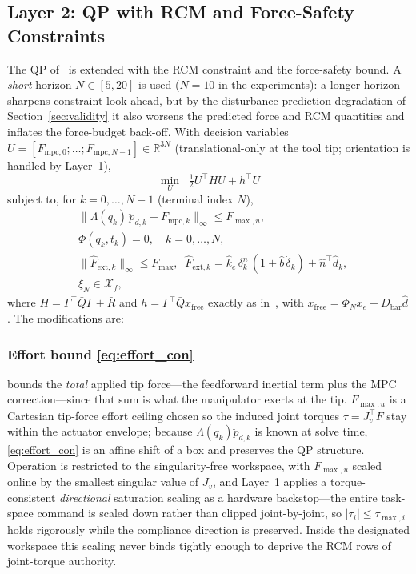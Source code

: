 \subsection{Layer 2: QP with RCM and Force-Safety Constraints}\label{sec:qp}

The QP of~\cite{cao2026phri} is extended with the RCM constraint and the force-safety bound. A \emph{short} horizon $N\in[5,20]$ is used ($N=10$ in the experiments): a longer horizon sharpens constraint look-ahead, but by the disturbance-prediction degradation of Section~\ref{sec:validity} it also worsens the predicted force and RCM quantities and inflates the force-budget back-off. With decision variables $U = [F_{\text{mpc},0}; \dots; F_{\text{mpc},N{-}1}] \in \mathbb{R}^{3N}$ (translational-only at the tool tip; orientation is handled by Layer~1),
\begin{equation}
\min_U \;\; \tfrac{1}{2} U^\top H U + h^\top U
\label{eq:qpcost}
\end{equation}
subject to, for $k = 0,\dots,N{-}1$ (terminal index $N$),
\begin{subequations}
\begin{align}
&\big\| \Lambda(q_k)\,\ddot{p}_{d,k} + F_{\text{mpc},k} \big\|_\infty \le F_{\max,u}, \label{eq:effort_con}\\
&\Phi(q_k, t_k) = 0, \quad k = 0, \dots, N, \label{eq:rcm_con}\\
&\big\| \widehat{F}_{\text{ext},k} \big\|_\infty \le F_{\max}, \;\;
  \widehat{F}_{\text{ext},k} = \hat k_e\,\delta_k^{n}\,(1{+}\hat b\,\dot\delta_k)
   + \hat n^\top \hat d_k, \label{eq:force_con}\\
&\xi_N \in \mathcal{X}_f, \label{eq:terminal_con}
\end{align}
\end{subequations}
where $H = \Gamma^\top \bar{Q} \Gamma + \bar{R}$ and $h = \Gamma^\top \bar{Q} x_{\text{free}}$ exactly as in~\cite{cao2026phri}, with $x_{\text{free}} = \Phi_N x_e + D_{\text{bar}} \hat{d}$. The modifications are:

\subsubsection{Effort bound \eqref{eq:effort_con}} bounds the \emph{total} applied tip force---the feedforward inertial term plus the MPC correction---since that sum is what the manipulator exerts at the tip. $F_{\max,u}$ is a Cartesian tip-force effort ceiling chosen so the induced joint torques $\tau = J_v^\top F$ stay within the actuator envelope; because $\Lambda(q_k)\ddot p_{d,k}$ is known at solve time, \eqref{eq:effort_con} is an affine shift of a box and preserves the QP structure. Operation is restricted to the singularity-free workspace, with $F_{\max,u}$ scaled online by the smallest singular value of $J_v$, and Layer~1 applies a torque-consistent \emph{directional} saturation scaling as a hardware backstop---the entire task-space command is scaled down rather than clipped joint-by-joint, so $|\tau_i|\le\tau_{\max,i}$ holds rigorously while the compliance direction is preserved. Inside the designated workspace this scaling never binds tightly enough to deprive the RCM rows of joint-torque authority.

